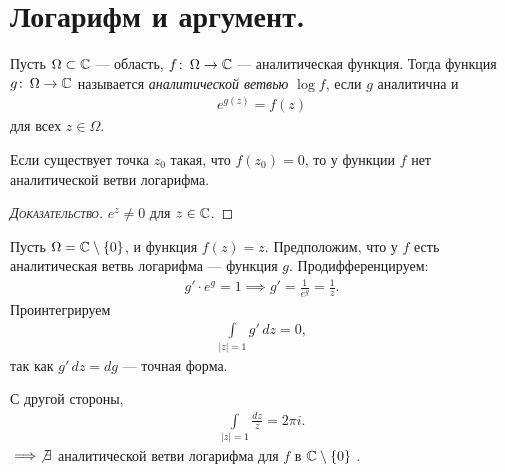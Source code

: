 \documentclass[../../main.tex]{subfiles}
\begin{document}
\section{Логарифм и аргумент.}

\begin{df}
 Пусть $ \Omega  \subset \mathbb{C}$ --- область, $ f \colon\, \Omega \to \mathbb{C}   $ --- аналитическая функция. Тогда функция $ g \colon\, \Omega \to \mathbb{C}   $ называется \textit{аналитической ветвью} $ \log f $, если $ g $ аналитична и
 \begin{align*}
  e^{g(z)} = f(z)
 \end{align*} для всех $ z \in \Omega $.
\end{df}
\begin{remrk}
 Если существует точка $ z_0 $ такая, что $ f(z_0) = 0 $, то у функции $ f $ нет аналитической ветви логарифма. 
\end{remrk}
\begin{proof}[\normalfont\textsc{Доказательство}]
 $ e^{z} \neq 0 $ для $ z \in \mathbb{C} $.
\end{proof}

\begin{exmpl}
 Пусть $ \Omega = \mathbb{C} \setminus \left\{ 0 \right\} $, и функция $ f(z) = z $. Предположим, что у $ f $ есть аналитическая ветвь логарифма --- функция $ g $. Продифференцируем:
 \begin{align*}
  g' \cdot e^{g} = 1 \implies g' = \frac{1}{e^{g}} = \frac{1}{z}.
 \end{align*} Проинтегрируем
 \begin{align*}
  \int\limits_{\left| z \right|=1} g'\,dz = 0,
 \end{align*} так как $ g'\,dz = dg $ --- точная форма.

 С другой стороны,
 \begin{align*}
  \int\limits_{\left| z \right|=1}   \frac{dz}{z} = 2\pi i.
\end{align*} $\implies \not \exists$ аналитической ветви логарифма для $f$ в $\mathbb{C} \setminus \left\{ 0 \right\} $ .   
\end{exmpl}
\end{document}
